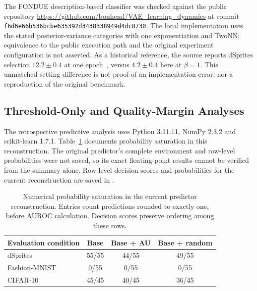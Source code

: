 \documentclass[make,article,submit,pdftex,moreauthors]{Definitions/mdpi}
\begin{document}
The FONDUE description-based classifier was checked against the public
repository \url{https://github.com/bonheml/VAE_learning_dynamics} at
commit \texttt{f6d6e66b536bcbe635392d3438338949d4dc8730}. The local
implementation uses the stated posterior-variance categories with one
exponentiation and TwoNN; equivalence to the public execution path and
the original experiment configuration is not asserted. As a historical
reference, the source reports dSprites selection $12.2\pm0.4$ at one
epoch~\cite{bonheme2022fondue}, versus $4.2\pm0.4$ here at $\beta=1$.
This unmatched-setting difference is not proof of an implementation
error, nor a reproduction of the original benchmark.

\subsection{Threshold-Only and Quality-Margin Analyses}\label{app:sensitivity}
The retrospective predictive analysis uses Python 3.11.11,
NumPy 2.3.2 and scikit-learn 1.7.1. Table~\ref{tab:saturation}
documents probability saturation in this reconstruction. The original
predictor's complete environment and row-level probabilities were not
saved, so its exact floating-point results cannot be verified from the
summary alone. Row-level decision scores and probabilities for the
current reconstruction are saved in .
\begin{table}[H]
\caption{Numerical probability saturation in the current predictor reconstruction. Entries count predictions rounded to exactly one, before AUROC calculation. Decision scores preserve ordering among these rows.}\label{tab:saturation}
\small
\setlength{\tabcolsep}{3.5pt}
\begin{tabular*}{\textwidth}{@{\extracolsep{\fill}}lccc@{}}
\toprule
Evaluation condition & Base & Base + AU & Base + random \\
\midrule
dSprites & 55/55 & 44/55 & 49/55 \\
Fashion-MNIST & 0/55 & 0/55 & 0/55 \\
CIFAR-10 & 45/45 & 40/45 & 36/45 \\
\bottomrule
\end{tabular*}
\end{table}
\end{document}
